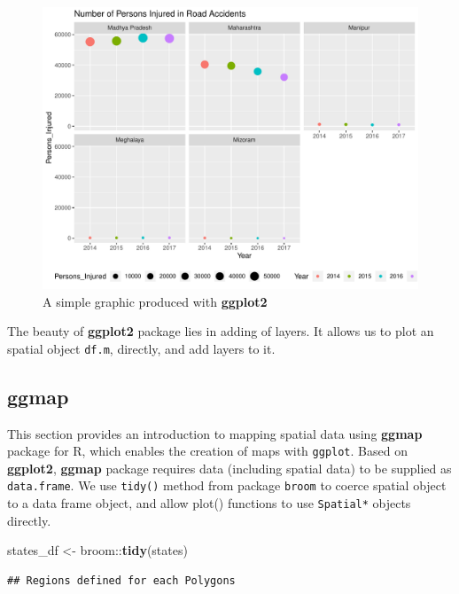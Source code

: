 \documentclass[]{article}
\newenvironment{Shaded}{}{}
\newcommand{\KeywordTok}[1]{\textcolor[rgb]{0.00,0.44,0.13}{\textbf{#1}}}
\newcommand{\NormalTok}[1]{#1}
\newcommand{\OperatorTok}[1]{\textcolor[rgb]{0.40,0.40,0.40}{#1}}
\newcommand{\StringTok}[1]{\textcolor[rgb]{0.25,0.44,0.63}{#1}}
\begin{document}
\begin{figure}
\centering
\includegraphics{TutorialNotebook_files/figure-latex/unnamed-chunk-19-1.pdf}
\caption{A simple graphic produced with \textbf{ggplot2}}
\end{figure}

The beauty of \textbf{ggplot2} package lies in adding of layers. It
allows us to plot an spatial object \texttt{df.m}, directly, and add
layers to it.

\hypertarget{ggmap}{%
\subsection{ggmap}\label{ggmap}}

This section provides an introduction to mapping spatial data using
\textbf{ggmap} package for R, which enables the creation of maps with
\texttt{ggplot}. Based on \textbf{ggplot2}, \textbf{ggmap} package
requires data (including spatial data) to be supplied as
\texttt{data.frame}. We use \texttt{tidy()} method from package
\texttt{broom} to coerce spatial object to a data frame object, and
allow plot() functions to use \texttt{Spatial*} objects directly.

\begin{Shaded}
\begin{Highlighting}[]
\NormalTok{states_df <-}\StringTok{ }\NormalTok{broom}\OperatorTok{::}\KeywordTok{tidy}\NormalTok{(states)}
\end{Highlighting}
\end{Shaded}

\begin{verbatim}
## Regions defined for each Polygons
\end{verbatim}
\end{document}
